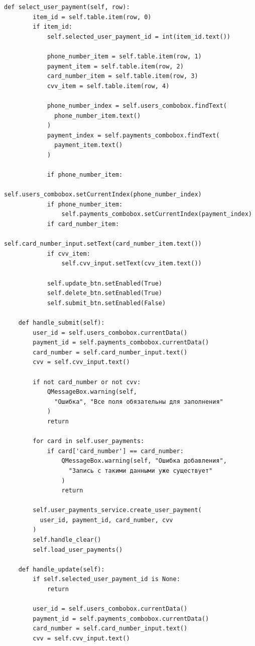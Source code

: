 \documentclass[a4paper,14pt]{extarticle}
\begin{document}
\begin{Verbatim}[tabsize=4,fontsize=\small]
    def select_user_payment(self, row):
        item_id = self.table.item(row, 0)
        if item_id:
            self.selected_user_payment_id = int(item_id.text())

            phone_number_item = self.table.item(row, 1)
            payment_item = self.table.item(row, 2)
            card_number_item = self.table.item(row, 3)
            cvv_item = self.table.item(row, 4)

            phone_number_index = self.users_combobox.findText(
              phone_number_item.text()
            )
            payment_index = self.payments_combobox.findText(
              payment_item.text()
            )

            if phone_number_item:
                self.users_combobox.setCurrentIndex(phone_number_index)
            if phone_number_item:
                self.payments_combobox.setCurrentIndex(payment_index)
            if card_number_item:
                self.card_number_input.setText(card_number_item.text())
            if cvv_item:
                self.cvv_input.setText(cvv_item.text())

            self.update_btn.setEnabled(True)
            self.delete_btn.setEnabled(True)
            self.submit_btn.setEnabled(False)

    def handle_submit(self):
        user_id = self.users_combobox.currentData()
        payment_id = self.payments_combobox.currentData()
        card_number = self.card_number_input.text()
        cvv = self.cvv_input.text()

        if not card_number or not cvv:
            QMessageBox.warning(self,
              "Ошибка", "Все поля обязательны для заполнения"
            )
            return

        for card in self.user_payments:
            if card['card_number'] == card_number:
                QMessageBox.warning(self, "Ошибка добавления",
                  "Запись с такими данными уже существует"
                )
                return

        self.user_payments_service.create_user_payment(
          user_id, payment_id, card_number, cvv
        )
        self.handle_clear()
        self.load_user_payments()

    def handle_update(self):
        if self.selected_user_payment_id is None:
            return

        user_id = self.users_combobox.currentData()
        payment_id = self.payments_combobox.currentData()
        card_number = self.card_number_input.text()
        cvv = self.cvv_input.text()


\end{Verbatim}
\end{document}
